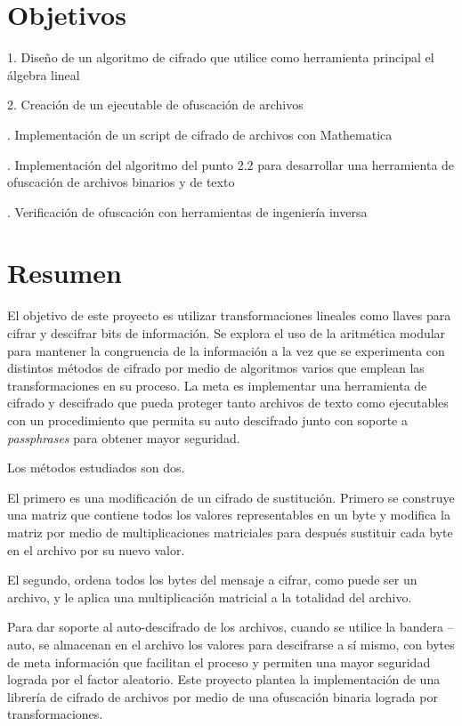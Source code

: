 \documentclass[a4paper]{article}
\begin{document}
\vfill

\newpage
\tableofcontents

\newpage
\section{Objetivos}

1. Diseño de un algoritmo de cifrado que utilice como herramienta principal el
álgebra lineal

2. Creación de un ejecutable de ofuscación de archivos

. Implementación de un script de cifrado de archivos con Mathematica

. Implementación del algoritmo del punto 2.2 para desarrollar una
herramienta de 
ofuscación
de
archivos
binarios
y
de
texto 

. Verificación de ofuscación con herramientas de ingeniería inversa

\section{Resumen}

El objetivo de este proyecto es utilizar transformaciones lineales como llaves
para cifrar y descifrar bits de información.
Se explora el uso de la aritmética modular para mantener la congruencia de la
información
 a la vez que se experimenta con distintos métodos de cifrado por medio de
algoritmos varios que emplean las transformaciones en su proceso.
La meta es implementar una herramienta de cifrado y descifrado que pueda
proteger tanto archivos de texto como ejecutables con un procedimiento
que permita su auto descifrado junto con soporte a \textit{passphrases} para
obtener mayor seguridad.

Los métodos estudiados son dos. 

El primero es una modificación de un cifrado de sustitución. Primero se
construye una matriz que contiene todos los valores representables en un 
byte y modifica la matriz por medio de multiplicaciones matriciales para
después sustituir cada byte en el archivo por su nuevo valor. 

El segundo, ordena todos los bytes del mensaje a cifrar, como puede ser un
archivo, y le aplica una multiplicación matricial a la totalidad del archivo. 

Para dar soporte al auto-descifrado de los archivos, cuando se utilice la
bandera --auto, se almacenan en el archivo los valores para descifrarse a sí
mismo, 
con bytes de meta información que facilitan el proceso y permiten una mayor
seguridad lograda por el factor aleatorio. Este proyecto plantea la
implementación 
de una librería de cifrado de archivos por medio de una ofuscación binaria
lograda por transformaciones.
\end{document}
